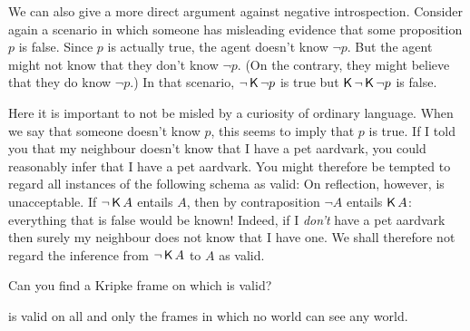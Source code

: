 We can also give a more direct argument against negative introspection. Consider
again a scenario in which someone has misleading evidence that some proposition
$p$ is false. Since $p$ is actually true, the agent doesn't know $\neg p$. But
the agent might not know that they don't know $\neg p$. (On the contrary, they
might believe that they do know $\neg p$.) In that scenario, $\neg\operatorname{\mathsf{K}{}} \neg p$ is
true but $\operatorname{\mathsf{K}{}} \neg \operatorname{\mathsf{K}{}} \neg p$ is false.

Here it is important to not be misled by a curiosity of ordinary language. When
we say that someone doesn't know $p$, this seems to imply that $p$ is true. If I
told you that my neighbour doesn't know that I have a pet aardvark, you could
reasonably infer that I have a pet aardvark. You might therefore be tempted to
regard all instances of the following schema as valid:
%
%
On reflection, however,  is unacceptable. If $\neg \operatorname{\mathsf{K}{}} A$ entails $A$,
then by contraposition $\neg A$ entails $\operatorname{\mathsf{K}{}} A$: everything that is false would
be known! Indeed, if I \emph{don't} have a pet aardvark then surely my neighbour
does not know that I have one. We shall therefore not regard the inference from
$\neg \operatorname{\mathsf{K}{}} A$ to $A$ as valid.

\begin{exercise}
  Can you find a Kripke frame on which  is valid?
\end{exercise}
\begin{solution}
   is valid on all and only the frames in which no world can see any world. 
\end{solution}

